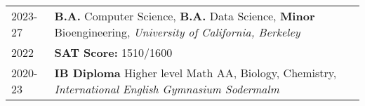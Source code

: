 

\renewcommand{\thefootnote}{\fnsymbol{footnote}}
\setcounter{footnote}{0}

\begin{longtable}[l]{@{}p{} p{}}

    2023-27\footnotemark & \textbf{B.A.} Computer Science, \textbf{B.A.} Data Science, \textbf{Minor} Bioengineering, \emph{University of California, Berkeley} \\

    2022 & \textbf{SAT Score:} 1510/1600\\

    2020-23 & \textbf{IB Diploma} Higher level Math AA, Biology, Chemistry, \emph{International English Gymnasium Sodermalm} \\
\end{longtable}



\renewcommand{\thefootnote}{\arabic{footnote}}
\setcounter{footnote}{1}
